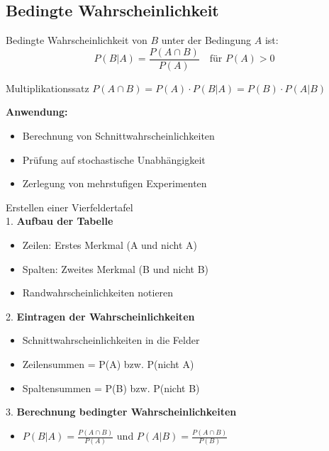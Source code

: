\subsection{Bedingte Wahrscheinlichkeit}

\begin{definition}{Bedingte Wahrscheinlichkeit}
von $B$ unter der Bedingung $A$ ist:
$$P(B|A) = \frac{P(A \cap B)}{P(A)} \quad \text{für } P(A) > 0$$
\end{definition}

\begin{theorem}{Multiplikationssatz}
$P(A \cap B)=P(A) \cdot P(B|A)=P(B) \cdot P(A|B)$

\textbf{Anwendung:}
\begin{itemize}
    \item Berechnung von Schnittwahrscheinlichkeiten
    \item Prüfung auf stochastische Unabhängigkeit
    \item Zerlegung von mehrstufigen Experimenten
\end{itemize}
\end{theorem}

\begin{KR}{Erstellen einer Vierfeldertafel}\\
1. \textbf{Aufbau der Tabelle}
   \begin{itemize}
   \item Zeilen: Erstes Merkmal (A und nicht A)
   \item Spalten: Zweites Merkmal (B und nicht B)
   \item Randwahrscheinlichkeiten notieren
   \end{itemize}

2. \textbf{Eintragen der Wahrscheinlichkeiten}
   \begin{itemize}
   \item Schnittwahrscheinlichkeiten in die Felder
   \item Zeilensummen = P(A) bzw. P(nicht A)
   \item Spaltensummen = P(B) bzw. P(nicht B)
   \end{itemize}

3. \textbf{Berechnung bedingter Wahrscheinlichkeiten}
   \begin{itemize}
   \item $P(B|A) = \frac{P(A \cap B)}{P(A)}$ und $P(A|B) = \frac{P(A \cap B)}{P(B)}$
   \end{itemize}
\end{KR}

